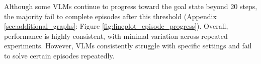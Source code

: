 Although some VLMs continue to progress toward the goal state beyond 20 steps, the majority fail to complete episodes after this threshold (Appendix \ref{sec:additional_graphs}: Figure \ref{fig:lineplot_episode_progress}). Overall, performance is highly consistent, with minimal variation across repeated experiments. However, VLMs consistently struggle with specific settings and fail to solve certain episodes repeatedly.